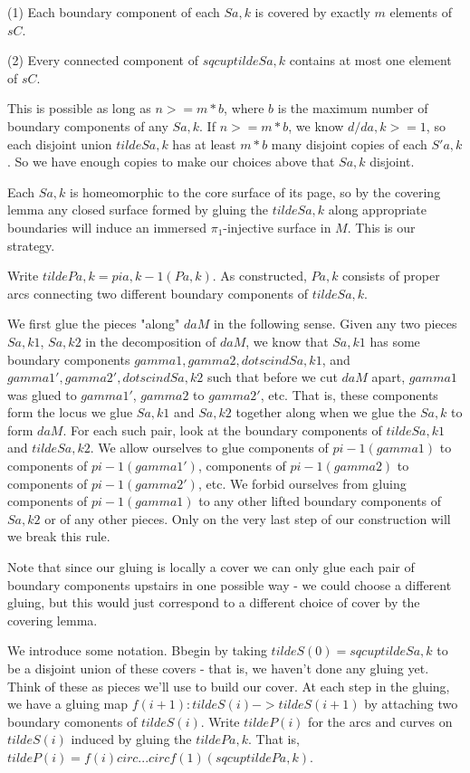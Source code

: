 \documentclass[12pt]{amsart}
\theoremstyle{definition}
\theoremstyle{remark}
\begin{document}
(1) Each boundary component of each $Sa,k$ is covered by exactly $m$ elements
of $sC$.

(2) Every connected component of $sqcup tildeSa,k$ contains at most one element
of $sC$.

This is possible as long as $n >= m*b$, where $b$ is the maximum number of
boundary components of any $Sa,k$. If $n>= m*b$, we know $d/da,k >= 1$, so each
disjoint union $tildeSa,k$ has at least $m*b$ many disjoint copies of each
$S'a,k$.  So we have enough copies to make our choices above that $Sa,k$
disjoint.

Each $Sa,k$ is homeomorphic to the core surface of its page, so by the covering
lemma any closed surface formed by gluing the $tildeSa,k$ along appropriate
boundaries will induce an immersed $\pi_1$-injective surface in $M$. This is
our strategy.

Write $tildePa,k=pia,k-1(Pa,k)$. As constructed, $Pa,k$ consists of proper arcs
connecting two different boundary components of $tildeSa,k$.

We first glue the pieces "along" $daM$ in the following sense. Given any two
pieces $Sa,k1$, $Sa,k2$ in the decomposition of $daM$, we know that $Sa,k1$ has
some boundary components $gamma1,gamma2,dots cin dSa,k1$, and
$gamma1',gamma2',dots cin dSa,k2$ such that before we cut $daM$ apart, $gamma1$
was glued to $gamma1'$, $gamma2$ to $gamma2'$, etc.  That is, these components
form the locus we glue $Sa,k1$ and $Sa,k2$ together along when we glue the
$Sa,k$ to form $daM$.  For each such pair, look at the boundary components of
$tildeSa,k1$ and $tildeSa,k2$.  We allow ourselves to glue components of
$pi-1(gamma1)$ to components of $pi-1(gamma1')$, components of $pi-1(gamma2)$
to components of $pi-1(gamma2')$, etc. We forbid ourselves from gluing
components of $pi-1(gamma1)$ to any other lifted boundary components of $Sa,k2$
or of any other pieces. Only on the very last step of our construction will we
break this rule.

Note that since our gluing is locally a cover we can only glue each pair of
boundary components upstairs in one possible way - we could choose a different
gluing, but this would just correspond to a different choice of cover by the
covering lemma.

We introduce some notation. Bbegin by taking $tildeS(0) = sqcup tildeSa,k$ to
be a disjoint union of these covers - that is, we haven't done any gluing yet.
Think of these as pieces we'll use to build our cover. At each step in the
gluing, we have a gluing map $f(i+1) : tildeS(i) -> tildeS(i+1)$ by attaching
two boundary comonents of $tildeS(i)$. Write $tildeP(i)$ for the arcs and
curves on $tildeS(i)$ induced by gluing the $tildePa,k$.  That is, $tildeP(i)
= f(i) circ ...  circ f(1) (sqcup tildePa,k)$.
\end{document}
